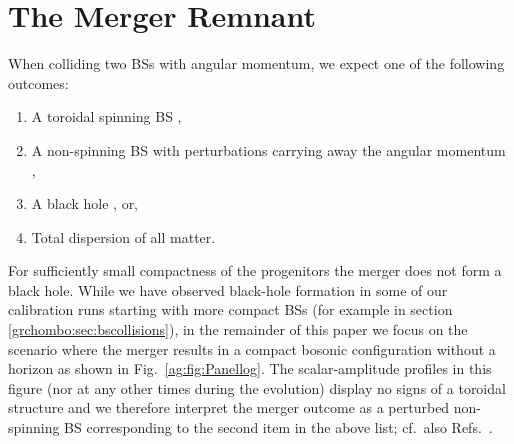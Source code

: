 \section{The Merger Remnant}\label{ag:sec:Remannt}



When colliding two BSs with angular momentum, we
expect one of the following outcomes:
\begin{enumerate}
    \item A toroidal spinning BS
        \cite{PhysRevD.90.024068,Yoshida:1997qf,1996rscc.conf..138S,Siemonsen:2020hcg},
    \item A non-spinning BS with perturbations carrying away the angular
        momentum
        \cite{Macedo:2013jja,Macedo:2016wgh,Yoshida:1994xi,Flores:2019iwp},
    \item A black hole \cite{Helfer:2018vtq,Palenzuela:2017kcg,Bezares:2018qwa}, or,
    \item Total dispersion of all matter.
\end{enumerate}
For sufficiently small compactness of the progenitors the merger does not form a black hole. While we have observed black-hole
formation in some of our calibration runs starting with more compact
BSs (for example in section \ref{grchombo:sec:bscollisions}), in the remainder of this paper we focus on the scenario
where the merger results in a compact bosonic configuration
without a horizon as shown in Fig.~\ref{ag:fig:Panellog}.
The scalar-amplitude profiles in this figure (nor at any other
times during the evolution) display no signs
of a toroidal structure and we therefore interpret the merger
outcome as a perturbed non-spinning BS corresponding to the
second item in the above list; cf.~also
Refs.~\cite{Palenzuela:2017kcg,Bezares:2018qwa}.


